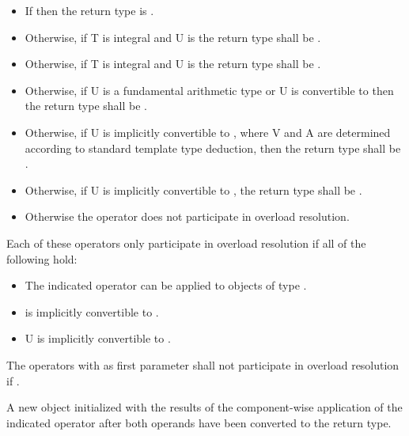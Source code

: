 \begin{itemdescr}
\begin{itemize}
\begin{itemize}
      \end{itemize}
    \item If 
      then the return type is .
    \item Otherwise, if \type T is integral and \type U is \intt
      the return type shall be \datapar{}.
    \item Otherwise, if \type T is integral and \type U is \uint
      the return type shall be \datapar{}.
    \item Otherwise, if \type U is a fundamental arithmetic type or \type U is convertible to \intt
      then the return type shall be .
    \item Otherwise, if \type U is implicitly convertible to \datapar{}, where \type V and \type A are determined according to standard template type deduction,
      then the return type shall be .
    \item Otherwise, if \type U is implicitly convertible to \datapar{},
      the return type shall be \datapar{}.
    \item Otherwise the operator does not participate in overload resolution.%
  \end{itemize}

  \pnum\remarks Each of these operators only participate in overload resolution if all of the following hold:
  \begin{itemize}
    \item The indicated operator can be applied to objects of type \dataparreturntype{}\code{::}.
    \item \datapar{} is implicitly convertible to \dataparreturntype.
    \item \type U is implicitly convertible to \dataparreturntype.
  \end{itemize}

  \pnum\remarks The operators with  as first parameter shall not participate in overload resolution if .

  \pnum\returns A new \datapar object initialized with the results of the component-wise application of the indicated operator after both operands have been converted to the return type.
\end{itemdescr}

